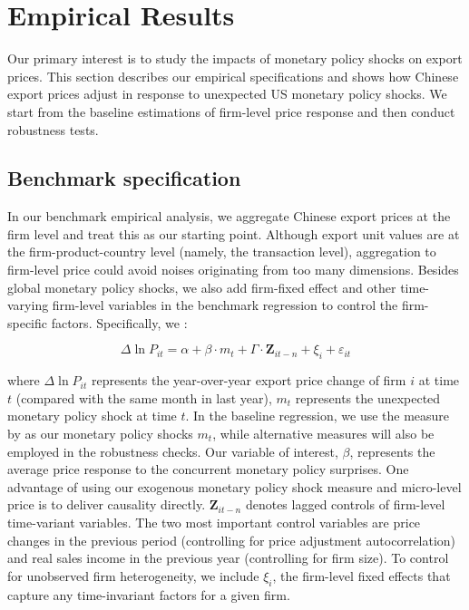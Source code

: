 \newpage
\section{Empirical Results}

Our primary interest is to study the impacts of monetary policy shocks on export prices. This section describes our empirical specifications and shows how Chinese export prices adjust in response to unexpected US monetary policy shocks. We start from the baseline estimations of firm-level price response and then conduct robustness tests.

\subsection{Benchmark specification}

In our benchmark empirical analysis, we aggregate Chinese export prices at the firm level and treat this as our starting point. Although export unit values are at the firm-product-country level (namely, the transaction level), aggregation to firm-level price could avoid noises originating from too many dimensions. Besides global monetary policy shocks, we also add firm-fixed effect and other time-varying firm-level variables in the benchmark regression to control the firm-specific factors. Specifically, we :

\begin{equation}
    \Delta \ln P_{it} = \alpha+\beta \cdot m_{t}+ \Gamma \cdot \textbf{Z}_{it-n}+\xi_{i}+\varepsilon_{it}
\end{equation}

\noindent where $\Delta \ln P_{it}$ represents the year-over-year export price change of firm $i$ at time $t$ (compared with the same month in last year), $m_t$ represents the unexpected monetary policy shock at time $t$. In the baseline regression, we use the measure by \cite{bu2021unified} as our monetary policy shocks $m_t$, while alternative measures will also be employed in the robustness checks. Our variable of interest, $\beta$, represents the average price response to the concurrent monetary policy surprises. One advantage of using our exogenous monetary policy shock measure and micro-level price is to deliver causality directly. $\textbf{Z}_{it-n}$ denotes lagged controls of firm-level time-variant variables. The two most important control variables are price changes in the previous period (controlling for price adjustment autocorrelation) and real sales income in the previous year (controlling for firm size). To control for unobserved firm heterogeneity, we include $\xi_{i}$, the firm-level fixed effects that capture any time-invariant factors for a given firm.

